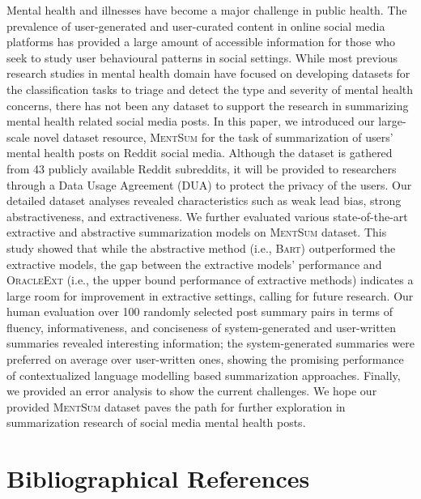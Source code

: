 \documentclass[10pt, a4paper]{article}
\newcommand{\bart}{\textsc{Bart}}
\newcommand{\mentsum}{\textsc{MentSum}}
\begin{document}
Mental health and illnesses have become a major challenge in public health. The prevalence of user-generated and user-curated content in online social media platforms has provided a large amount of accessible information for those who seek to study user behavioural patterns in social settings. While most previous research studies in mental health domain  have focused on developing datasets for the classification tasks to triage and detect the type and severity of mental health concerns, there has not been any dataset to support the research in summarizing mental health related social media posts.  
In this paper, we introduced our large-scale novel dataset resource, \mentsum{} for the task of summarization of users' mental health posts on Reddit social media. Although the dataset is gathered from 43 publicly available Reddit subreddits, it will be provided to researchers through a Data Usage Agreement (DUA) to protect the privacy of the users. 
Our detailed dataset analyses
revealed characteristics such as weak lead bias, strong abstractiveness, and extractiveness. We further evaluated various state-of-the-art extractive and abstractive summarization models on \mentsum{} dataset. This study showed that 
while the abstractive method (i.e., \bart) outperformed the extractive models, 
the gap between the extractive models' performance and \textsc{OracleExt} (i.e., the upper bound performance of extractive methods) indicates a large room for improvement in extractive settings, calling for future research. Our human evaluation over 100 randomly selected post summary pairs in terms of fluency, informativeness, and conciseness of system-generated and user-written summaries revealed interesting information; the system-generated summaries were preferred on average over user-written ones,  showing the promising performance of contextualized language modelling based summarization approaches. Finally, we provided an error analysis to show the current challenges. We hope our provided \mentsum{} dataset paves the path for further exploration in summarization research of social media mental health posts.  
%
 



\section{Bibliographical References}\label{reference}



\end{document}
